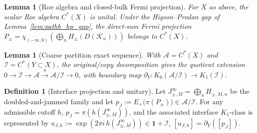 \documentclass[11pt]{article}
\numberwithin{equation}{section}
\newtheorem{lemma}[theorem]{Lemma}
\theoremstyle{definition}
\newtheorem{definition}[theorem]{Definition}
\theoremstyle{remark}
\newcommand{\K}{\mathcal{K}}
\newcommand{\Id}{\mathbf{1}}
\begin{document}
\begin{lemma}[Roe algebra and closed-bulk Fermi projection]\label{lem:pathb_roe_setup}
For \(X\) as above, the scalar Roe algebra \(C^*(X)\) is unital. Under the Higson--Prodan gap of
Lemma~\ref{lem:pathb_hp_gap}, the direct-sum Fermi projection
\(P_\pm=\chi_{(-\infty,0)}\!\left(\bigoplus_n H_\pm(D(\K_n))\right)\) belongs to \(C^*(X)\).
\end{lemma}

\begin{lemma}[Coarse partition exact sequence]\label{lem:pathb_exact_sequence}
With \(\mathcal A=C^*(X)\) and \(\mathcal I=C^*(Y\subset X)\), the original/copy decomposition gives
the quotient extension
\(0\to\mathcal I\to\mathcal A\xrightarrow{\pi}\mathcal A/\mathcal I\to0\), with boundary map
\(\partial_Y:K_0(\mathcal A/\mathcal I)\to K_1(\mathcal I)\).
\end{lemma}

\begin{definition}[Interface projection and unitary]\label{def:pathb_interface_projection}
Let \(J_{\pm,M}^\infty=\bigoplus_n H_{\pm,M,n}\) be the doubled-and-jammed family and let
\(p_J:=E_+\bigl(\pi(P_\pm)\bigr)\in\mathcal A/\mathcal I\). For any admissible cutoff \(h\),
\(p_J=\pi(h(J_{\pm,M}^\infty))\), and the associated interface \(K_1\)-class is represented by
\(u_{J,h}:=\exp(2\pi i\,h(J_{\pm,M}^\infty))\in\Id+\mathcal I\),
\([u_{J,h}]=\partial_Y([p_J])\).
\end{definition}
\end{document}
